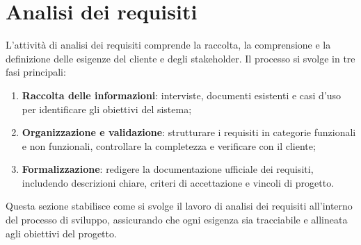 \section{Analisi dei requisiti}

L'attività di analisi dei requisiti comprende la raccolta, la comprensione e la definizione delle esigenze del cliente e degli stakeholder. Il processo si svolge in tre fasi principali:
\begin{enumerate}
  \item \textbf{Raccolta delle informazioni}: interviste, documenti esistenti e casi d'uso per identificare gli obiettivi del sistema;
  \item \textbf{Organizzazione e validazione}: strutturare i requisiti in categorie funzionali e non funzionali, controllare la completezza e verificare con il cliente;
  \item \textbf{Formalizzazione}: redigere la documentazione ufficiale dei requisiti, includendo descrizioni chiare, criteri di accettazione e vincoli di progetto.
\end{enumerate}

Questa sezione stabilisce come si svolge il lavoro di analisi dei requisiti all'interno del processo di sviluppo, assicurando che ogni esigenza sia tracciabile e allineata agli obiettivi del progetto.
